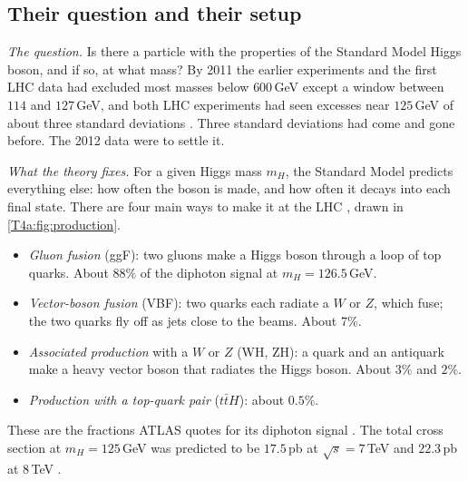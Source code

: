 \subsection{Their question and their setup}
\label{T4a:sec:higgs-setup}

\emph{The question.} Is there a particle with the properties of the Standard Model Higgs boson, and if so, at what mass? By 2011 the earlier experiments and the first LHC data had excluded most masses below $600$\,GeV except a window between $114$ and $127$\,GeV, and both LHC experiments had seen excesses near $125$\,GeV of about three standard deviations \cite[Sec.~1]{AadHiggs2012}. Three standard deviations had come and gone before. The 2012 data were to settle it.

\emph{What the theory fixes.} For a given Higgs mass $m_H$, the Standard Model predicts everything else: how often the boson is made, and how often it decays into each final state. There are four main ways to make it at the LHC \cite[Sec.~3]{AadHiggs2012}, drawn in \cref{T4a:fig:production}.
\begin{itemize}[itemsep=1pt,leftmargin=1.2em]
  \item \emph{Gluon fusion} (ggF): two gluons make a Higgs boson through a loop of top quarks. About $88\%$ of the diphoton signal at $m_H=126.5$\,GeV.
  \item \emph{Vector-boson fusion} (VBF): two quarks each radiate a $W$ or $Z$, which fuse; the two quarks fly off as jets close to the beams. About $7\%$.
  \item \emph{Associated production} with a $W$ or $Z$ (WH, ZH): a quark and an antiquark make a heavy vector boson that radiates the Higgs boson. About $3\%$ and $2\%$.
  \item \emph{Production with a top-quark pair} ($t\bar tH$): about $0.5\%$.
\end{itemize}
These are the fractions ATLAS quotes for its diphoton signal \cite[Sec.~5.4]{AadHiggs2012}. The total cross section at $m_H=125$\,GeV was predicted to be $17.5$\,pb at $\sqrt s=7$\,TeV and $22.3$\,pb at $8$\,TeV \cite[Sec.~3]{AadHiggs2012}.

